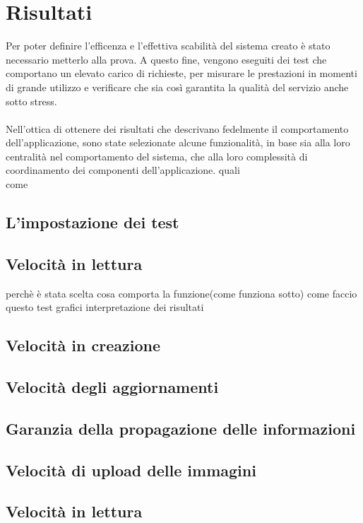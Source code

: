
\chapter{Risultati}
Per poter definire l'efficenza e l'effettiva scabilità del sistema creato 
è stato necessario metterlo alla prova. 
A questo fine, vengono eseguiti dei test che comportano un elevato carico di richieste,
per misurare le prestazioni in momenti di grande utilizzo e
verificare che sia così garantita la qualità del servizio anche sotto stress.\\
\\
Nell'ottica di ottenere dei risultati che descrivano fedelmente 
il comportamento dell'applicazione,
sono state selezionate alcune funzionalità,
in base sia alla loro centralità nel comportamento del sistema,
che alla loro complessità di coordinamento dei componenti dell'applicazione.
quali\\

come
\section{L'impostazione dei test}

\section{Velocità in lettura}
perchè è stata scelta
cosa comporta la funzione(come funziona sotto)
come faccio questo test
grafici
interpretazione dei risultati
\section{Velocità in creazione}
\section{Velocità degli aggiornamenti}
\section{Garanzia della propagazione delle informazioni}
\section{Velocità di upload delle immagini}


\section{Velocità in lettura}

